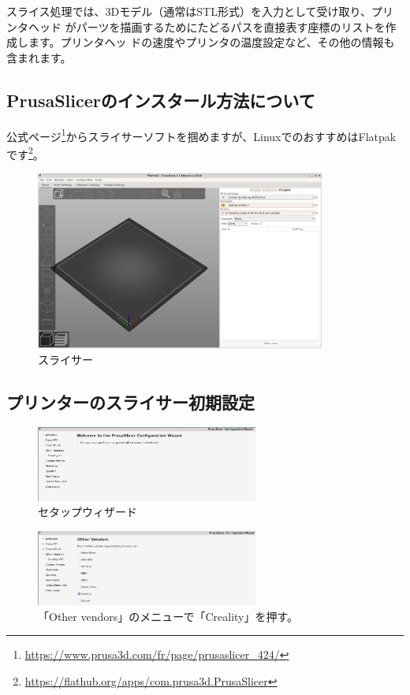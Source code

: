 \documentclass[10pt,a4paper,onecolumn,notitlepage,oneside,dvipdfmx]{article}
\begin{document}
スライス処理では、3Dモデル（通常はSTL形式）を入力として受け取り、プリンタヘッド
がパーツを描画するためにたどるパスを直接表す座標のリストを作成します。プリンタヘッ
ドの速度やプリンタの温度設定など、その他の情報も含まれます。

\subsection{PrusaSlicerのインスタール方法について}
\label{sec:orgf9f9349}
公式ページ\footnote{\url{https://www.prusa3d.com/fr/page/prusaslicer\_424/}}からスライサーソフトを掴めますが、LinuxでのおすすめはFlatpakです\footnote{\url{https://flathub.org/apps/com.prusa3d.PrusaSlicer}}。

\begin{figure}[htbp]
\centering
\includegraphics[width=0.85\textwidth]{img/ps.png}
\caption{スライサー}
\end{figure}

\subsection{プリンターのスライサー初期設定}
\label{sec:org33a2f17}
\begin{figure}[htbp]
\centering
\includegraphics[width=0.65\textwidth]{img/welcome.png}
\caption{セタップウィザード}
\end{figure}

\begin{figure}[htbp]
\centering
\includegraphics[width=0.65\textwidth]{img/crea.png}
\caption{「Other vendors」のメニューで「Creality」を押す。}
\end{figure}
\end{document}
